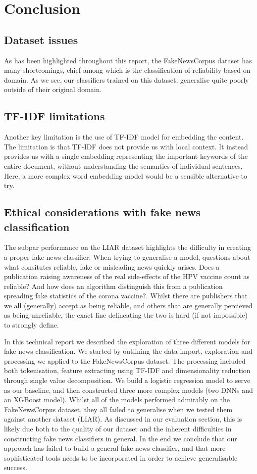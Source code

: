 \section{Conclusion}

\subsection{Dataset issues}
As has been highlighted throughout this report, the FakeNewsCorpus dataset has many shortcomings, chief among which is
the classification of reliability based on domain. As we see, our classifiers trained on this dataset, generalise quite
poorly outside of their original domain.

\subsection{TF-IDF limitations}
Another key limitation is the use of TF-IDF model for embedding the content. The limitation is that TF-IDF does
not provide us with local context. It instead provides us with a single embedding representing the important keywords of the
entire document, without understanding the semantics of individual sentences. Here, a more complex word embedding model
would be a sensible alternative to try.

\subsection{Ethical considerations with fake news classification}
The subpar performance on the LIAR dataset highlights the difficulty in creating a proper fake news classifier. When trying to
generalise a model, questions about what consitutes reliable, fake or misleading news quickly arises. Does a publication raising awareness
of the real side-effects of the HPV vaccine count as reliable? And how does an algorithm distinguish this from a
publication spreading fake statistics of the corona vaccine?. Whilst there are publishers that we all (generally)
accept as being reliable, and others that are generally percieved as being unreliable, the exact line delineating the
two is hard (if not impossible) to strongly define.


In this technical report we described the exploration of three different models for fake news classification. We started
by outlining the data import, exploration and processing we applied to the FakeNewsCorpus dataset. The processing
included both tokenisation, feature extracting using TF-IDF and dimensionality reduction through single value
decomposition. We build a logistic regression model to serve as our baseline, and then constructed three more complex
models (two DNNs and an XGBoost model). Whilst all of the models performed admirably on the FakeNewsCorpus dataset, they
all failed to generalise when we tested them against another dataset (LIAR). As discussed in our evaluation section,
this is likely due both to the quality of our dataset and the inherent difficulties in constructing fake news
classifiers in general. In the end we conclude that our approach has failed to build a general fake news classifier, and
that more sophisticated tools needs to be incorporated in order to achieve generalisable success.

